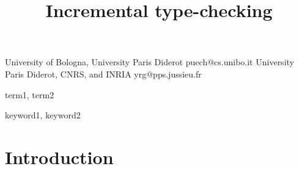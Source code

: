 \documentclass[preprint]{sigplanconf}
\newcommand\rem[2]{\textcolor{Mahogany}{{\textsf{#1}} $\triangleright$
    \textsl{#2}}}
\newcommand\mrem[1]{\rem{M}{#1}}
\begin{document}
\copyrightdata{[to be supplied]}


\title{Incremental type-checking}

           {University of Bologna, University Paris Diderot}
           {puech@cs.unibo.it}
           {University Paris Diderot, CNRS, and INRIA}
           {yrg@pps.jussieu.fr}

\maketitle

\begin{abstract}


\end{abstract}


\terms
term1, term2

\keywords
keyword1, keyword2

\section{Introduction}


\end{document}
